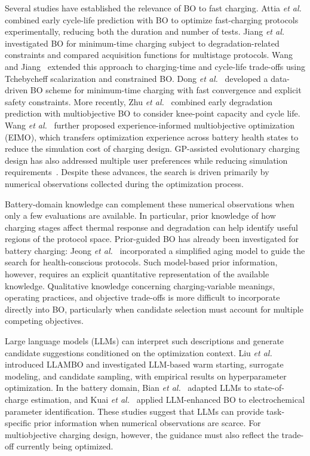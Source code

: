 Several studies have established the relevance of BO to fast charging.
Attia \emph{et al.}~\cite{nref3} combined early cycle-life prediction with BO
to optimize fast-charging protocols experimentally, reducing both the duration
and number of tests. Jiang \emph{et al.}~\cite{nref7} investigated BO for
minimum-time charging subject to degradation-related constraints and compared
acquisition functions for multistage protocols. Wang and Jiang~\cite{nref8}
extended this approach to charging-time and cycle-life trade-offs using
Tchebycheff scalarization and constrained BO. Dong \emph{et
al.}~\cite{refDongBO} developed a data-driven BO scheme for minimum-time
charging with fast convergence and explicit safety constraints. More recently,
Zhu \emph{et al.}~\cite{refZhuMOBO} combined early degradation prediction with
multiobjective BO to consider knee-point capacity and cycle life.
Wang \emph{et al.}~\cite{refEIMO} further proposed experience-informed
multiobjective optimization (EIMO), which transfers optimization experience
across battery health states to reduce the simulation cost of charging design.
GP-assisted evolutionary charging design has also addressed multiple user
preferences while reducing simulation requirements~\cite{refGPA}. Despite
these advances, the search is driven primarily by numerical observations
collected during the optimization process.

Battery-domain knowledge can complement these numerical observations when only
a few evaluations are available. In particular, prior knowledge of how
charging stages affect thermal response and degradation can help identify
useful regions of the protocol space. Prior-guided BO has already been
investigated for battery charging: Jeong \emph{et al.}~\cite{refPriorCharging}
incorporated a simplified aging model to guide the search for health-conscious
protocols. Such model-based prior information, however,
requires an explicit quantitative representation of the available knowledge.
Qualitative knowledge concerning charging-variable meanings, operating
practices, and objective trade-offs is more difficult to incorporate directly
into BO, particularly when candidate selection must account for multiple
competing objectives.

Large language models (LLMs) can interpret such descriptions and generate
candidate suggestions conditioned on the optimization context. Liu \emph{et
al.}~\cite{nref12} introduced LLAMBO and investigated LLM-based warm starting,
surrogate modeling, and candidate sampling, with empirical results on
hyperparameter optimization. In the battery domain, Bian \emph{et
al.}~\cite{refBianLLM} adapted LLMs to state-of-charge estimation, and Kuai
\emph{et al.}~\cite{refKuaiLLMBO} applied LLM-enhanced BO to electrochemical
parameter identification.
These studies suggest that LLMs can provide task-specific prior information when
numerical observations are scarce. For multiobjective charging design, however,
the guidance must also reflect the trade-off currently being optimized.

